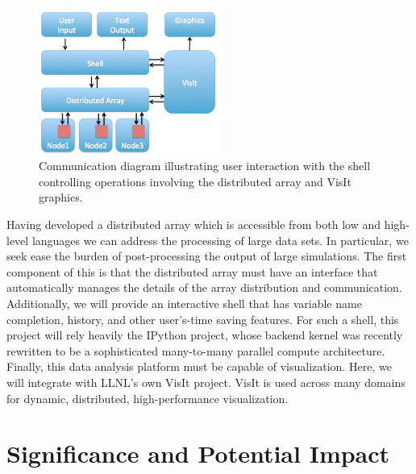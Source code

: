 \documentclass[letterpaper,11pt]{article}
\begin{document}
\begin{figure}
	\vspace{-20pt}
	\begin{center}
		\includegraphics[width=0.53\textwidth]{communication.jpg}
	\end{center}
	\caption{Communication diagram illustrating user interaction with the shell
	controlling operations involving the distributed array and VisIt graphics.}
	\label{fig:communication}
	\vspace{-10pt}
\end{figure}

Having developed a distributed array which is accessible from both low and high-level 
languages we can address the processing of large data sets.  In particular, we seek 
ease the burden of post-processing the output of large simulations. 
The first component of this is that the distributed array must have an interface that 
automatically manages the details of the array distribution and communication.  
Additionally, we will provide an interactive shell that has variable name completion, 
history, and other user's-time saving features.  For such a shell, this project will 
rely heavily the IPython project, whose backend kernel was recently rewritten to be a 
sophisticated many-to-many parallel compute architecture.  Finally, this data analysis 
platform must be capable of visualization.  Here, we will integrate with LLNL's own VisIt 
project.  VisIt is used across many domains for dynamic, distributed, 
high-performance visualization.


\section*{Significance and Potential Impact}
\end{document}
